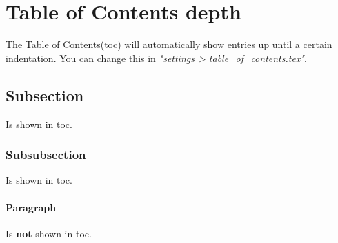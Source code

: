 \section{Table of Contents depth}
The Table of Contents(toc) will automatically show entries up until a certain indentation. You can change this in \textit{"settings > table\_of\_contents.tex"}.

\subsection{Subsection}
Is shown in toc.

\subsubsection{Subsubsection}
Is shown in toc.

\paragraph{Paragraph}
Is \textbf{not} shown in toc.